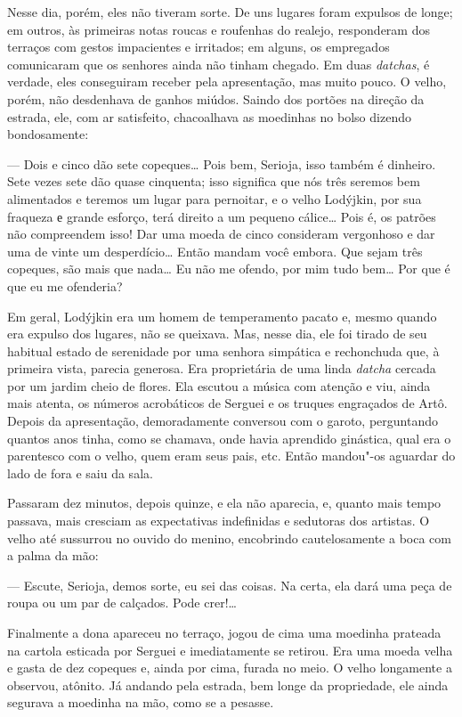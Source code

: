 Nesse dia, porém, eles não tiveram sorte. De uns lugares foram expulsos
de longe; em outros, às primeiras notas roucas e roufenhas do realejo,
responderam dos terraços com gestos impacientes e irritados; em alguns,
os empregados comunicaram que os senhores ainda não tinham chegado. Em
duas \emph{datchas}, é verdade, eles conseguiram receber pela
apresentação, mas muito pouco. O velho, porém, não desdenhava de ganhos
miúdos. Saindo dos portões na direção da estrada, ele, com ar
satisfeito, chacoalhava as moedinhas no bolso dizendo bondosamente:

--- Dois e cinco dão sete copeques\ldots{} Pois bem, Serioja, isso também é
dinheiro. Sete vezes sete dão quase cinquenta; isso significa que nós
três seremos bem alimentados e teremos um lugar para pernoitar, e o
velho Lodýjkin, por sua fraqueza е grande esforço, terá direito a um
pequeno cálice\ldots{} Pois é, os patrões não compreendem isso! Dar uma moeda
de cinco consideram vergonhoso e dar uma de vinte um desperdício\ldots{}
Então mandam você embora. Que sejam três copeques, são mais que nada\ldots{}
Eu não me ofendo, por mim tudo bem\ldots{} Por que é que eu me ofenderia?

Em geral, Lodýjkin era um homem de temperamento pacato e, mesmo quando
era expulso dos lugares, não se queixava. Mas, nesse dia, ele foi tirado
de seu habitual estado de serenidade por uma senhora simpática e
rechonchuda que, à primeira vista, parecia generosa. Era proprietária de
uma linda \emph{datcha} cercada por um jardim cheio de flores. Ela
escutou a música com atenção e viu, ainda mais atenta, os números
acrobáticos de Serguei e os truques engraçados de Artô. Depois da
apresentação, demoradamente conversou com o garoto, perguntando quantos
anos tinha, como se chamava, onde havia aprendido ginástica, qual era o
parentesco com o velho, quem eram seus pais, etc. Então mandou"-os
aguardar do lado de fora e saiu da sala.

Passaram dez minutos, depois quinze, e ela não aparecia, e, quanto mais
tempo passava, mais cresciam as expectativas indefinidas e sedutoras dos
artistas. O velho até sussurrou no ouvido do menino, encobrindo
cautelosamente a boca com a palma da mão:

--- Escute, Serioja, demos sorte, eu sei das coisas. Na certa, ela dará
uma peça de roupa ou um par de calçados. Pode crer!\ldots{}

Finalmente a dona apareceu no terraço, jogou de cima uma moedinha
prateada na cartola esticada por Serguei e imediatamente se retirou. Era
uma moeda velha e gasta de dez copeques e, ainda por cima, furada no
meio. O velho longamente a observou, atônito. Já andando pela estrada,
bem longe da propriedade, ele ainda segurava a moedinha na mão, como se
a pesasse.

